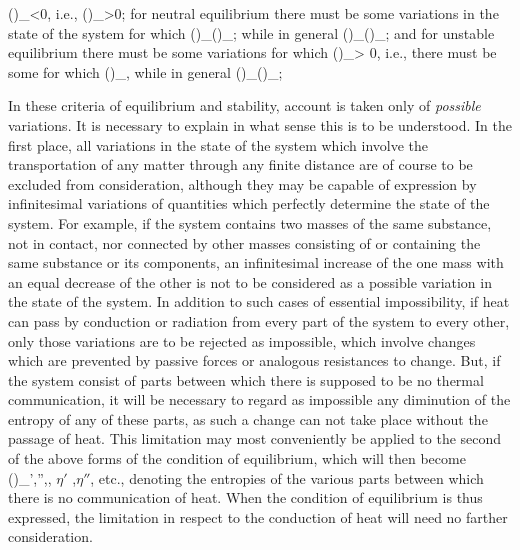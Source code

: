 \documentclass[12pt]{article}
\begin{document}
\eqs
(\Delta \eta)_\epsilon<0, i.e., (\Delta \epsilon)_\eta>0;      \label{3}            
\eqe
for neutral equilibrium there must be some variations in the state of the system for which
\eqs
(\Delta \eta)_(\Delta \epsilon)_;  \label{4}
\eqe
while in general
\eqs
(\Delta \eta)_\epsilon {}(\Delta \epsilon)_\eta {}; \label{5}
\eqe
and for unstable equilibrium there must be some variations for which
\eqs
(\Delta \eta)_\epsilon > 0,        \label{6}               
\eqe
i.e., there must be some for which
\eqs
(\Delta \epsilon)_\eta,         \label{7}                
\eqe
while in general
\eqs
(\delta \eta)_\epsilon {}(\delta \epsilon)_\eta {};\label{8}  
\eqe

In these criteria of equilibrium and stability, account is taken only of \emph{possible} variations. It is necessary to explain in what sense this is to be understood. In the first place, all variations in the state of the system which involve the transportation of any matter through any finite distance are of course to be excluded from consideration, although they may be capable of expression by infinitesimal variations of quantities which perfectly determine the state of the system. For example, if the system contains two masses of the same substance, not in contact, nor connected by other masses consisting of or containing the same substance or its components, an infinitesimal increase of the one mass with an equal decrease of the other is not to be considered as a possible variation in the state of the system. In addition to such cases of essential impossibility, if heat can pass by conduction or radiation from every part of the system to every other, only those variations are to be rejected as impossible, which involve changes which are prevented by passive forces or analogous resistances to change. But, if the system consist of parts between which there is supposed to be no thermal communication, it will be necessary to regard as impossible any diminution of the entropy of any of these parts, as such a change can not take place without the passage of heat. This limitation may most conveniently be applied to the second of the above forms of the condition of equilibrium, which will then become               
\eqs
(\delta \epsilon)_{\eta',\eta'',}, \label{9}
\eqe
$\eta'$ ,$\eta''$, etc., denoting the entropies of the various parts between which there is no communication of heat. When the condition of equilibrium is thus expressed, the limitation in respect to the conduction of heat will need no farther consideration.
\end{document}
